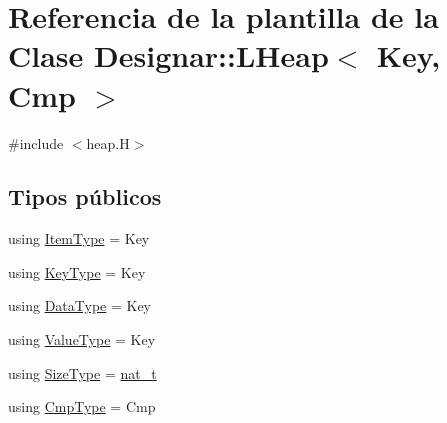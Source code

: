 \hypertarget{class_designar_1_1_l_heap}{}\section{Referencia de la plantilla de la Clase Designar\+:\+:L\+Heap$<$ Key, Cmp $>$}
\label{class_designar_1_1_l_heap}


{\ttfamily \#include $<$heap.\+H$>$}

\subsection*{Tipos públicos}
\begin{DoxyCompactItemize}
\item 
using \hyperlink{class_designar_1_1_l_heap_abb88755259887662cd93045937b6a045}{Item\+Type} = Key
\item 
using \hyperlink{class_designar_1_1_l_heap_a8d4160e7d11e74de54685fe905e30aa4}{Key\+Type} = Key
\item 
using \hyperlink{class_designar_1_1_l_heap_abacf82fc0de24e3d5954b075e3fb74b5}{Data\+Type} = Key
\item 
using \hyperlink{class_designar_1_1_l_heap_a7c24dbacc35909235f49057ffb3a8723}{Value\+Type} = Key
\item 
using \hyperlink{class_designar_1_1_l_heap_a2220ce9a3ac8209fda43d10778943e91}{Size\+Type} = \hyperlink{namespace_designar_aa72662848b9f4815e7bf31a7cf3e33d1}{nat\+\_\+t}
\item 
using \hyperlink{class_designar_1_1_l_heap_abb2b4f1228557317e5c3188771aea09c}{Cmp\+Type} = Cmp
\end{DoxyCompactItemize}
